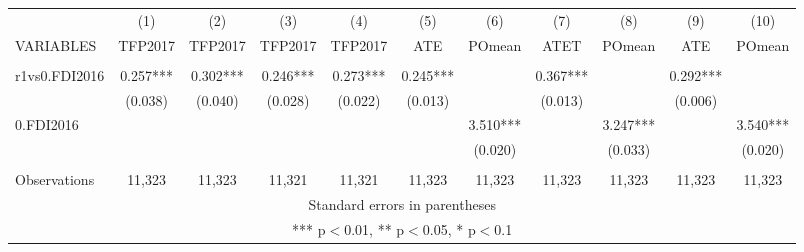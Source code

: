 \documentclass[]{article}
\begin{document}
\tiny
\begin{tabular}{lcccccccccc} \hline
 & (1) & (2) & (3) & (4) & (5) & (6) & (7) & (8) & (9) & (10) \\
VARIABLES & TFP2017 & TFP2017 & TFP2017 & TFP2017 & ATE & POmean & ATET & POmean & ATE & POmean \\ \hline
 &  &  &  &  &  &  &  &  &  &  \\
r1vs0.FDI2016 & 0.257*** & 0.302*** & 0.246*** & 0.273*** & 0.245*** &  & 0.367*** &  & 0.292*** &  \\
 & (0.038) & (0.040) & (0.028) & (0.022) & (0.013) &  & (0.013) &  & (0.006) &  \\
0.FDI2016 &  &  &  &  &  & 3.510*** &  & 3.247*** &  & 3.540*** \\
 &  &  &  &  &  & (0.020) &  & (0.033) &  & (0.020) \\
 &  &  &  &  &  &  &  &  &  &  \\
 Observations & 11,323 & 11,323 & 11,321 & 11,321 & 11,323 & 11,323 & 11,323 & 11,323 & 11,323 & 11,323 \\ \hline
\multicolumn{11}{c}{ Standard errors in parentheses} \\
\multicolumn{11}{c}{ *** p$<$0.01, ** p$<$0.05, * p$<$0.1} \\
\end{tabular}
\end{document}
